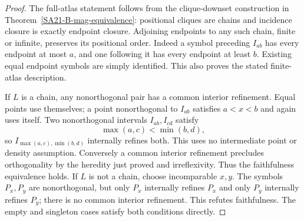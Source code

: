 \begin{proof}
The full-atlas statement follows from the clique-downset
construction in Theorem~\ref{SA21-B-mag-equivalence}: positional
cliques are chains and incidence closure is exactly endpoint
closure. Adjoining endpoints to any such chain, finite or infinite,
preserves its positional order. Indeed a symbol preceding $I_{ab}$
has every endpoint at most $a$, and one following it has every
endpoint at least $b$. Existing equal endpoint symbols are simply
identified. This also proves the stated finite-atlas description.

If $L$ is a chain, any nonorthogonal pair has a common interior
refinement. Equal points use themselves; a point nonorthogonal
to $I_{ab}$ satisfies $a<x<b$ and again uses itself. Two
nonorthogonal intervals $I_{ab},I_{cd}$ satisfy
\[
 \max(a,c)<\min(b,d),
\]
so $I_{\max(a,c),\min(b,d)}$ internally refines both. This
uses no intermediate point or density assumption. Conversely
a common interior refinement precludes orthogonality by the
heredity just proved and irreflexivity. Thus the faithfulness
equivalence holds. If $L$ is not a chain, choose incomparable
$x,y$. The symbols $P_x,P_y$ are nonorthogonal, but only $P_x$
internally refines $P_x$ and only $P_y$ internally refines $P_y$;
there is no common interior refinement. This refutes faithfulness.
The empty and singleton cases satisfy both conditions directly.
\end{proof}

